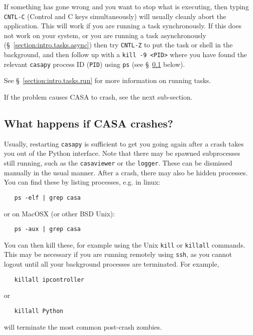 If something has gone wrong and you want to stop what is executing,
then typing {\tt CNTL-C} (Control and C keys simultaneously) will
usually cleanly abort the application. 
This will work if you are running a task synchronously.
If this does not work on your system, or you are running a task
asynchronously (\S~\ref{section:intro.tasks.async}) 
then try {\tt CNTL-Z} to put the task or shell in the
background, and then follow up with a {\tt kill -9 <PID>} where you
have found the relevant {\tt casapy} process ID ({\tt PID}) using 
{\tt ps} (see \S~\ref{section:intro.basics.crash} below).

See \S~\ref{section:intro.tasks.run} for more information on running tasks.

If the problem causes CASA to crash, see the next sub-section.

% 
% 
% 

\subsection{What happens if CASA crashes?}
\label{section:intro.basics.crash}

Usually, restarting {\tt casapy} is sufficient to get you going again
after a crash takes you out of the Python interface.  Note that there
may be spawned subprocesses still running, such as the 
{\tt casaviewer} or the {\tt logger}.  These can be dismissed manually
in the usual manner.  After a crash, there may also be hidden
processes.  You can find these by listing processes, e.g. in linux:
\small
\begin{verbatim}
   ps -elf | grep casa
\end{verbatim}
\normalsize
or on MacOSX (or other BSD Unix):
\small
\begin{verbatim}
   ps -aux | grep casa
\end{verbatim}
\normalsize
You can then kill these, for example using the Unix {\tt kill}
or {\tt killall} commands.  This may be necessary if you are running
remotely using {\tt ssh}, as you cannot logout until all your
background processes are terminated.  For example,
\small
\begin{verbatim}
   killall ipcontroller
\end{verbatim}
\normalsize
or
\small
\begin{verbatim}
   killall Python
\end{verbatim}
\normalsize
will terminate the most common post-crash zombies.

